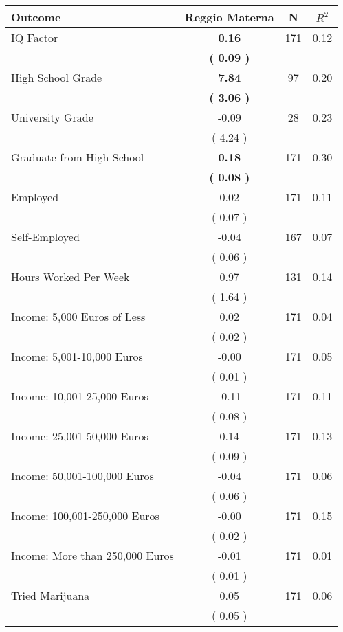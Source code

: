 \begin{tabular}{lccc}
\toprule
 \textbf{Outcome} & \textbf{Reggio Materna} & \textbf{N} & \textbf{$ R^2$} \\
\midrule
IQ Factor & \textbf{     0.16} & 171 &      0.12 \\ 
 & \textbf{(     0.09 )} & \\
High School Grade & \textbf{     7.84} & 97 &      0.20 \\ 
 & \textbf{(     3.06 )} & \\
University Grade &     -0.09 & 28 &      0.23 \\ 
 & (     4.24 ) & \\
Graduate from High School & \textbf{     0.18} & 171 &      0.30 \\ 
 & \textbf{(     0.08 )} & \\
Employed &      0.02 & 171 &      0.11 \\ 
 & (     0.07 ) & \\
Self-Employed &     -0.04 & 167 &      0.07 \\ 
 & (     0.06 ) & \\
Hours Worked Per Week &      0.97 & 131 &      0.14 \\ 
 & (     1.64 ) & \\
Income: 5,000 Euros of Less &      0.02 & 171 &      0.04 \\ 
 & (     0.02 ) & \\
Income: 5,001-10,000 Euros &     -0.00 & 171 &      0.05 \\ 
 & (     0.01 ) & \\
Income: 10,001-25,000 Euros &     -0.11 & 171 &      0.11 \\ 
 & (     0.08 ) & \\
Income: 25,001-50,000 Euros &      0.14 & 171 &      0.13 \\ 
 & (     0.09 ) & \\
Income: 50,001-100,000 Euros &     -0.04 & 171 &      0.06 \\ 
 & (     0.06 ) & \\
Income: 100,001-250,000 Euros &     -0.00 & 171 &      0.15 \\ 
 & (     0.02 ) & \\
Income: More than 250,000 Euros &     -0.01 & 171 &      0.01 \\ 
 & (     0.01 ) & \\
Tried Marijuana &      0.05 & 171 &      0.06 \\ 
 & (     0.05 ) & \\

\end{tabular}
